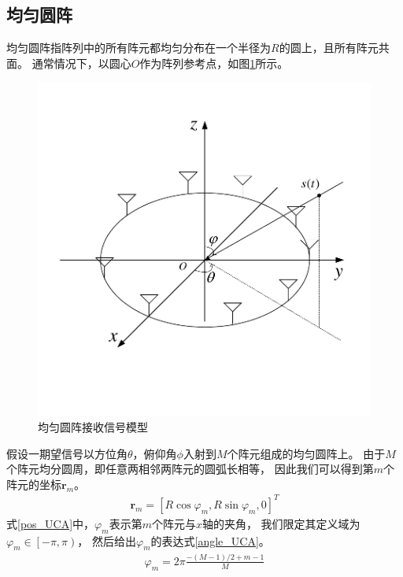 \documentclass[master]{thesis-uestc}
\begin{document}
\subsection{均匀圆阵}
均匀圆阵指阵列中的所有阵元都均匀分布在一个半径为$R$的圆上，且所有阵元共面。
通常情况下，以圆心$O$作为阵列参考点，如图\ref{UCA}所示。
\begin{figure}[h]
\includegraphics[scale=0.8]{pic/UCA.pdf}
\caption{均匀圆阵接收信号模型}
\label{UCA}
\end{figure}

假设一期望信号以方位角$\theta$，俯仰角$\phi$入射到$M$个阵元组成的均匀圆阵上。
由于$M$个阵元均分圆周，即任意两相邻两阵元的圆弧长相等，
因此我们可以得到第$m$个阵元的坐标$\bm{r}_m$。
\begin{equation}\label{pos_UCA}
    \begin{aligned}
        \bm{r}_m = \left[
            R\cos\varphi_m,
            R\sin\varphi_m,
            0
           \right]^T 
    \end{aligned}
\end{equation}
式\eqref{pos_UCA}中，$\varphi_m$表示第$m$个阵元与$x$轴的夹角，
我们限定其定义域为$\varphi_m\in\left[-\pi,\pi\right)$，
然后给出$\varphi_m$的表达式\eqref{angle_UCA}。
\begin{equation}\label{angle_UCA}
    \begin{aligned}
        \varphi_m = 2\pi\frac{-(M-1)/2+m-1}{M}
    \end{aligned}
\end{equation}
\end{document}

